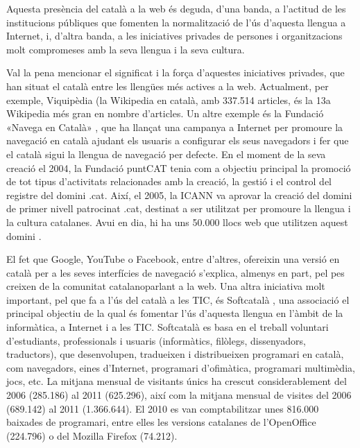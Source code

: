 \begin{multicols}{2}
Aquesta presència del català a la web és deguda, d’una banda, a l’actitud de les institucions públiques que fomenten la normalització de l’ús d’aquesta llengua a Internet, i, d’altra banda, a les iniciatives privades de persones i organitzacions molt compromeses amb la seva llengua i la seva cultura.

Val la pena mencionar el significat i la força d’aquestes iniciatives privades, que han situat el català entre les llengües més actives a la web. Actualment, per exemple, Viquipèdia (la Wikipedia en català, amb 337.514 articles, és la 13a Wikipedia més gran en nombre d’articles. Un altre exemple és la Fundació «Navega en Català» \cite{CAT-Nota19}, que ha llançat una campanya a Internet per promoure la navegació en català ajudant els usuaris a configurar els seus navegadors i fer que el català sigui la llengua de navegació per defecte. En el moment de la seva creació el 2004, la Fundació puntCAT tenia com a objectiu principal la promoció de tot tipus d’activitats relacionades amb la creació, la gestió i el control del registre del domini .cat. Així, el 2005, la ICANN va aprovar la creació del domini de primer nivell patrocinat .cat, destinat a ser utilitzat per promoure la llengua i la cultura catalanes. Avui en dia, hi ha uns 50.000 llocs web que utilitzen aquest domini \cite{CAT-Nota20}.


El fet que Google, YouTube o Facebook, entre d’altres, ofereixin una versió en català per a les seves interfícies de navegació s’explica, almenys en part, pel pes creixen de la comunitat catalanoparlant a la web. Una altra iniciativa molt important, pel que fa a l’ús del català a les TIC, és Softcatalà \cite{CAT-Nota21}, una associació el principal objectiu de la qual és fomentar l’ús d’aquesta llengua en l’àmbit de la informàtica, a Internet i a les TIC. Softcatalà es basa en el treball voluntari d’estudiants, professionals i usuaris (informàtics, filòlegs, dissenyadors, traductors), que desenvolupen, tradueixen i distribueixen programari en català, com navegadors, eines d’Internet, programari d’ofimàtica, programari multimèdia, jocs, etc. La mitjana mensual de visitants únics ha crescut considerablement del 2006 (285.186) al 2011 (625.296), així com la mitjana mensual de visites del 2006  (689.142) al 2011 (1.366.644). El 2010 es van comptabilitzar unes 816.000 baixades de programari, entre elles les versions catalanes de l’OpenOffice (224.796) o del Mozilla Firefox (74.212).


\end{multicols}
